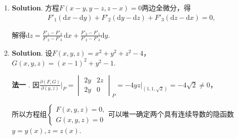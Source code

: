 \documentclass[../main.tex]{subfiles}
\begin{document}
\begin{enumerate}
          平行六面体$\overrightarrow{PQ}\boldsymbol{s}_{1}\boldsymbol{s}_{2}$的体积$V
              =\left|\overrightarrow{PQ}\cdot (\boldsymbol{s}_{1}\times \boldsymbol{s}_{2}
              )\right|=\left|
              \begin{vmatrix}
                  1 & 1  & 2 \\
                  1 & -1 & 1 \\
                  1 & 3  & 4
              \end{vmatrix}\right|=2$，

          又$V=h\cdot |\boldsymbol{s}_{1}\times \boldsymbol{s}_{2}|$，其中$h$为两直线之间的距离，所以$h
              =\frac{V}{|\boldsymbol{s}_{1}\times \boldsymbol{s}_{2}|}=\frac{2}{2\sqrt{3}}
              =\frac{\sqrt{3}}{3}$.

    \item \textbf{Solution}. 方程$F(x-y,y-z,z-x)=0$两边全微分，得
          \[
              \begin{aligned}
                  F'_{1}\left(\mathrm{d}x-\mathrm{d}y\right) + F'_{2}\left(\mathrm{d}y-\mathrm{d}z\right) + F'_{3}\left(\mathrm{d}z-\mathrm{d}x\right) = 0,
              \end{aligned}
          \]

          解得$\mathrm{d}z = \frac{F'_{1}-F'_{3}}{F'_{2}-F'_{3}}\,\mathrm{d}x + \frac{F'_{2}-F'_{1}}{F'_{2}-F'_{3}}
              \mathrm{d}y$.

    \item \textbf{Solution}. 设$F(x,y,z) = x^{2}+y^{2}+z^{2}-4$，$G(x,y,z)=(x-1)^{2}
              +y^{2}-1$.

          \textbf{法一} . 因$\frac{\partial (F,G)}{\partial (y,z)}\bigg|_{P}=
              \begin{vmatrix}
                  2y & 2z \\
                  2y & 0
              \end{vmatrix}_{P}=\left.-4yz\right|_{\left(1,1,\sqrt{2}\right)}=-4\sqrt{2}\neq
              0$，

          所以方程组$\begin{cases}
                  F(x,y,z)=0, \\
                  G(x,y,z)=0
              \end{cases}$可以唯一确定两个具有连续导数的隐函数$y=y(x),z=z(x)$.


\end{enumerate}
\end{document}
